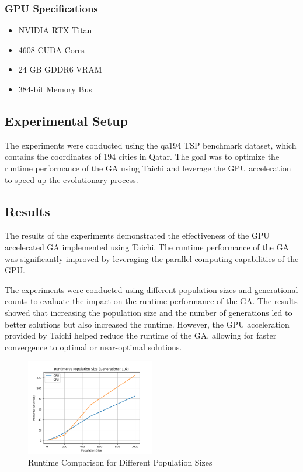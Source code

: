 \documentclass[conference]{IEEEtran}
\begin{document}
\subsubsection{GPU Specifications}
\begin{itemize}
    \item NVIDIA RTX Titan
    \item 4608 CUDA Cores
    \item 24 GB GDDR6 VRAM
    \item 384-bit Memory Bus
\end{itemize}

\subsection{Experimental Setup}
The experiments were conducted using the qa194 TSP benchmark dataset, which
contains the coordinates of 194 cities in Qatar. The goal was to optimize the
runtime performance of the GA using Taichi and leverage the GPU acceleration to
speed up the evolutionary process.

\subsection{Results}
The results of the experiments demonstrated the effectiveness of the GPU
accelerated GA implemented using Taichi. The runtime performance of the GA was
significantly improved by leveraging the parallel computing capabilities of the
GPU.

The experiments were conducted using different population sizes and
generational counts to evaluate the impact on the runtime performance of the
GA. The results showed that increasing the population size and the number of
generations led to better solutions but also increased the runtime. However,
the GPU acceleration provided by Taichi helped reduce the runtime of the GA,
allowing for faster convergence to optimal or near-optimal solutions.

\begin{figure}[H]
    \centerline{\includegraphics[width=0.5\textwidth]{runtime_vs_population_size.png}}
    \caption{Runtime Comparison for Different Population Sizes}
    \label{fig:1}
\end{figure}
\end{document}

